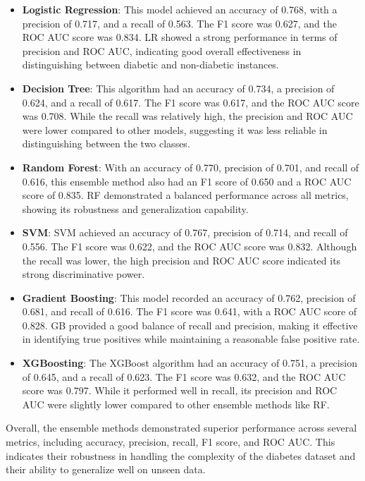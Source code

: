 \begin{itemize}
\item \textbf{Logistic Regression}: This model achieved an accuracy of 0.768, with a precision of 0.717, and a recall of 0.563. The F1 score was 0.627, and the ROC AUC score was 0.834. LR showed a strong performance in terms of precision and ROC AUC, indicating good overall effectiveness in distinguishing between diabetic and non-diabetic instances.
\item \textbf{Decision Tree}: This algorithm had an accuracy of 0.734, a precision of 0.624, and a recall of 0.617. The F1 score was 0.617, and the ROC AUC score was 0.708. While the recall was relatively high, the precision and ROC AUC were lower compared to other models, suggesting it was less reliable in distinguishing between the two classes.

\item \textbf{Random Forest}: With an accuracy of 0.770, precision of 0.701, and recall of 0.616, this ensemble method also had an F1 score of 0.650 and a ROC AUC score of 0.835. RF demonstrated a balanced performance across all metrics, showing its robustness and generalization capability.

\item \textbf{SVM}: SVM achieved an accuracy of 0.767, precision of 0.714, and recall of 0.556. The F1 score was 0.622, and the ROC AUC score was 0.832. Although the recall was lower, the high precision and ROC AUC score indicated its strong discriminative power.

\item \textbf{Gradient Boosting}: This model recorded an accuracy of 0.762, precision of 0.681, and recall of 0.616. The F1 score was 0.641, with a ROC AUC score of 0.828. GB provided a good balance of recall and precision, making it effective in identifying true positives while maintaining a reasonable false positive rate.

\item \textbf{XGBoosting}: The XGBoost algorithm had an accuracy of 0.751, a precision of 0.645, and a recall of 0.623. The F1 score was 0.632, and the ROC AUC score was 0.797. While it performed well in recall, its precision and ROC AUC were slightly lower compared to other ensemble methods like RF.
\end{itemize}

Overall, the ensemble methods demonstrated superior performance across several metrics, including accuracy, precision, recall, F1 score, and ROC AUC. This indicates their robustness in handling the complexity of the diabetes dataset and their ability to generalize well on unseen data.